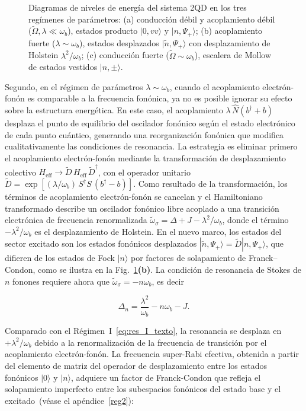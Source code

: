 \begin{figure}[htb]
\begin{minipage}[t]{0.40\textwidth}
{\begin{tikzpicture}[>=stealth, thick, font=\small, baseline=(current bounding box.north)]
		\end{tikzpicture}
		}
	\end{minipage}
	\caption{Diagramas de niveles de energía del sistema 2QD en los tres regímenes de parámetros: (a) conducción débil y acoplamiento débil ($\widetilde\Omega, \lambda \ll \omega_b$), estados producto $|0,vv\rangle$ y $|n,\Psi_+\rangle$; (b) acoplamiento fuerte ($\lambda \sim \omega_b$), estados desplazados $|\tilde{n},\Psi_+\rangle$ con desplazamiento de Holstein $\lambda^2/\omega_b$; (c) conducción fuerte ($\widetilde\Omega \sim \omega_b$), escalera de Mollow de estados vestidos $|n,\pm\rangle$.}
	\label{fig:niveles_regimenes}
\end{figure}

Segundo, en el régimen de parámetros $\lambda \sim \omega_b$, cuando el acoplamiento electrón-fonón es comparable a la frecuencia fonónica, ya no es posible ignorar su efecto sobre la estructura energética. En este caso, el acoplamiento $\lambda\,\hat{N}(b^\dagger + b)$ desplaza el punto de equilibrio del oscilador fonónico según el estado electrónico de cada punto cuántico, generando una reorganización fonónica que modifica cualitativamente las condiciones de resonancia. La estrategia es eliminar primero el acoplamiento electrón-fonón mediante la transformación de desplazamiento colectivo $H_\mathrm{eff} \to \widetilde{D}\, H_\mathrm{eff}\,\widetilde{D}^\dagger$, con el operador unitario $\widetilde{D} = \exp[(\lambda/\omega_b)\,S^\dagger S\,(b^\dagger - b)]$. Como resultado de la transformación, los términos de acoplamiento electrón-fonón se cancelan y el Hamiltoniano transformado describe un oscilador fonónico libre acoplado a una transición electrónica de frecuencia renormalizada $\widetilde\omega_\sigma = \Delta + J - \lambda^2/\omega_b$, donde el término $-\lambda^2/\omega_b$ es el desplazamiento de Holstein. En el nuevo marco, los estados del sector excitado son los estados fonónicos desplazados $|\tilde{n},\Psi_+\rangle = \widetilde{D}|n,\Psi_+\rangle$, que difieren de los estados de Fock $|n\rangle$ por factores de solapamiento de Franck--Condon, como se ilustra en la Fig.~\ref{fig:niveles_regimenes}\textbf{(b)}. La condición de resonancia de Stokes de $n$ fonones requiere ahora que $\widetilde\omega_\sigma = -n\omega_b$, es decir

\begin{equation}
	\Delta_n = \frac{\lambda^2}{\omega_b} - n\omega_b - J.
	\label{eq:res_II_texto}
\end{equation}

Comparado con el Régimen~I~\eqref{eq:res_I_texto}, la resonancia se desplaza en $+\lambda^2/\omega_b$ debido a la renormalización de la frecuencia de transición por el acoplamiento electrón-fonón. La frecuencia super-Rabi efectiva, obtenida a partir del elemento de matriz del operador de desplazamiento entre los estados fonónicos $|0\rangle$ y $|n\rangle$, adquiere un factor de Franck-Condon que refleja el solapamiento imperfecto entre los subespacios fonónicos del estado base y el excitado~(véase el apéndice~\ref{reg2}):

